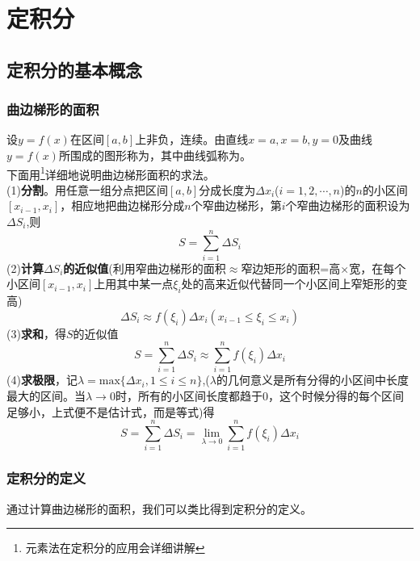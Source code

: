     \chapter{定积分}
\section{定积分的基本概念}
\subsection{曲边梯形的面积}
设$y=f(x)$在区间$[a,b]$上非负，连续。由直线$x=a,x=b,y=0$及曲线$y=f(x)$所围成的图形称为，其中曲线弧称为。\\
\thispagestyle{empty}
\kg 下面用\footnote{元素法在定积分的应用会详细讲解}详细地说明曲边梯形面积的求法。\\
\kg (1)\enspace\textbf{分割}。用任意一组分点把区间$[a,b]$分成长度为$\Delta x_i$($i=1,2,\cdots,n$)的$n$的小区间$[x_{i-1},x_i]$，相应地把曲边梯形分成$n$个窄曲边梯形，第$i$个窄曲边梯形的面积设为$\Delta S_i$,则
\begin{equation}
	S=\sum_{i=1}^{n}\Delta S_i
\end{equation}
\kg (2)\textbf{计算$\Delta S_i$的近似值}(利用窄曲边梯形的面积$\approx$窄边矩形的面积=高$\times$宽，在每个小区间$[x_{i-1},x_i]$上用其中某一点$\xi_i$处的高来近似代替同一个小区间上窄矩形的变高)
\begin{equation}
	\Delta S_i\approx f(\xi_i)\Delta x_i(x_{i-1}\leq \xi_i\leq x_i)
\end{equation}
\kg (3)\textbf{求和}，得$S$的近似值
\begin{equation}
	S=\sum_{i=1}^{n}\Delta S_i\approx\sum_{i=1}^{n} f(\xi_i)\Delta x_i
\end{equation}
\kg (4)\textbf{求极限}，记$\lambda=\text{max}\{\Delta x_i,1\leq i\leq n\}$,($\lambda$的几何意义是所有分得的小区间中长度最大的区间。当$\lambda\to0$时，所有的小区间长度都趋于0，这个时候分得的每个区间足够小，上式便不是估计式，而是等式)得
\begin{equation}
	S=\sum_{i=1}^{n}\Delta S_i=\lim\limits_{\lambda\to 0}\sum_{i=1}^{n}f(\xi_i)\Delta x_i
\end{equation}
\subsection{定积分的定义}
通过计算曲边梯形的面积，我们可以类比得到定积分的定义。
\\ 

